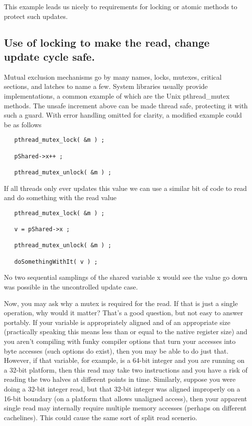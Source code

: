 
This example leads us nicely to requirements for locking or atomic methods to protect such updates.

\subsection{Use of locking to make the read, change update cycle safe.}

Mutual exclusion mechanisms go by many names, locks, mutexes, critical sections, and latches to name a few.  System libraries usually provide implementations, a common example of which are the Unix pthread\_mutex methods.  The unsafe increment above can be made thread safe, protecting it with such a guard.  With error handling omitted for clarity, a modified example could be as follows

\begin{lstlisting}
   pthread_mutex_lock( &m ) ;

   pShared->x++ ;

   pthread_mutex_unlock( &m ) ;
\end{lstlisting}

If all threads only ever updates this value we can use a similar bit of code to read and do something with the read value

\begin{lstlisting}
   pthread_mutex_lock( &m ) ;

   v = pShared->x ;

   pthread_mutex_unlock( &m ) ;

   doSomethingWithIt( v ) ;
\end{lstlisting}

No two sequential samplings of the shared variable x would see the value go down was possible in the uncontrolled update case.  

Now, you may ask why a mutex is required for the read.  If that is just a single operation, why would it matter?  That's a good question, but not easy to answer portably.  If your variable is appropriately aligned and of an appropriate size (practically speaking this means less than or equal to the native register size) and you aren't compiling with funky compiler options that turn your accesses into byte accesses (such options do exist), then you may be able to do just that.  However, if that variable, for example, is a 64-bit integer and you are running on a 32-bit platform, then this read may take two instructions and you have a risk of reading the two halves at different points in time.  Similarly, suppose you were doing a 32-bit integer read, but that 32-bit integer was aligned improperly on a 16-bit boundary (on a platform that allows unaligned access), then your apparent single read may internally require multiple memory accesses (perhaps on different cachelines).  This could cause the same sort of split read scenerio.

